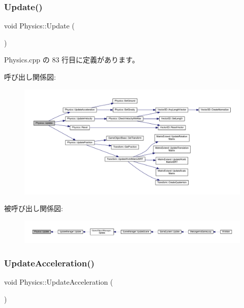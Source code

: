 \subsubsection{\texorpdfstring{Update()}{Update()}}
{\footnotesize\ttfamily void Physics\+::\+Update (\begin{DoxyParamCaption}{ }\end{DoxyParamCaption})}



 Physics.\+cpp の 83 行目に定義があります。

呼び出し関係図\+:\nopagebreak
\begin{figure}[H]
\begin{center}
\leavevmode
\includegraphics[width=350pt]{class_physics_a13bf3e9de07a12afc3c0a4012e00d0a1_cgraph}
\end{center}
\end{figure}
被呼び出し関係図\+:
\nopagebreak
\begin{figure}[H]
\begin{center}
\leavevmode
\includegraphics[width=350pt]{class_physics_a13bf3e9de07a12afc3c0a4012e00d0a1_icgraph}
\end{center}
\end{figure}
\mbox{\label{class_physics_a122041053c2c4e69cdf6dc92076e1d79}} 
\subsubsection{\texorpdfstring{Update\+Acceleration()}{UpdateAcceleration()}}
{\footnotesize\ttfamily void Physics\+::\+Update\+Acceleration (\begin{DoxyParamCaption}{ }\end{DoxyParamCaption})\hspace{0.3cm}{\ttfamily [private]}}



